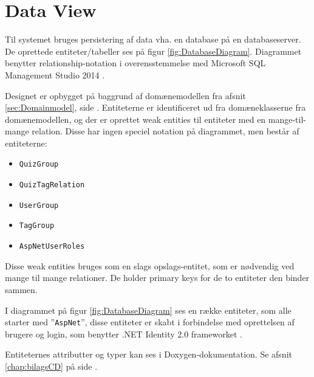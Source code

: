 \section{Data View}

Til systemet bruges persistering af data vha. en database på en databaseserver. De oprettede entiteter/tabeller ses på figur \ref{fig:DatabaseDiagram}. Diagrammet benytter relationship-notation i overensstemmelse med Microsoft SQL Management Studio 2014 \citep{sqlserverWeb}.

Designet er opbygget på baggrund af domænemodellen fra afsnit \ref{sec:Domainmodel}, side \pageref{sec:Domainmodel}. Entiteterne er identificeret ud fra domæneklasserne fra domænemodellen, og der er oprettet weak entities til entiteter med en mange-til-mange relation. Disse har ingen speciel notation på diagrammet, men består af entiteterne:

\begin{itemize}
	\item\verb+QuizGroup+
	\item\verb+QuizTagRelation+
	\item\verb+UserGroup+
	\item\verb+TagGroup+
	\item\verb+AspNetUserRoles+
\end{itemize}

Disse weak entities bruges som en slags opslags-entitet, som er nødvendig ved mange til mange relationer. De holder primary keys for de to entiteter den binder sammen.

I diagrammet på figur \ref{fig:DatabaseDiagram} ses en række entiteter, som alle starter med ''\verb+AspNet+'', disse entiteter er skabt i forbindelse med oprettelsen af brugere og login, som benytter .NET Identity 2.0 frameworket \citep{netidentityWeb}.


Entiteternes attributter og typer kan ses i Doxygen-dokumentation. Se afsnit \ref{chap:bilagsCD} på side \pageref{chap:bilagsCD}.
